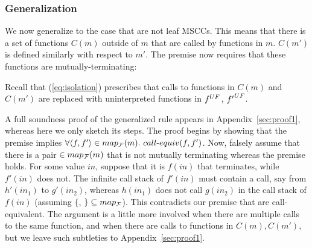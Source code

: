 
\subsubsection{Generalization} We now generalize \mtermd to the case that  are not leaf MSCCs. This means that there is a set of functions $C(m)$ outside of $m$ that are called by functions in $m$. $C(m')$ is defined similarly with respect to $m'$. The
premise now requires that these functions are mutually-terminating:

\begin{center}
\end{center}
%
Recall that (\ref{eq:isolation}) prescribes that calls to functions in $C(m)$ and $C(m')$ are replaced with uninterpreted functions in ${f}^{UF}$, ${f'}^{UF}$.

A full soundness proof of the generalized rule appears in Appendix~\ref{sec:proof1}, whereas
here we only sketch its steps. The proof begins by showing that the premise implies $\forall \pair{f, f'} \in\mapf(m).\ \requiv(f,f')$.
%
%
Now, falsely assume that there is a pair $\in map_{\cal F}(m)$ that is not mutually
terminating whereas the premise holds.
For some value $in$, suppose that it is $f(in)$ that terminates, while $f'(in)$
does not. The infinite call stack of $f'(in)$ must contain a call, say from
$h'(in_1)$ to $g'(in_2)$, whereas $h(in_1)$ does not call $g(in_2)$ in the call
stack of $f(in)$ (assuming $\{$, $\} \subseteq map_{\cal F}$).
This contradicts our premise that  are call-equivalent. The argument
is a little more involved when there are multiple calls to the same function, and when there are calls to functions in $C(m), C(m')$,
but we leave such subtleties to Appendix~\ref{sec:proof1}.

